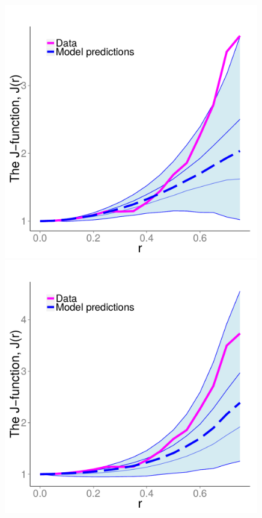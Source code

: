 \documentclass{statsoc}
\begin{document}
\begin{figure}
\begin{minipage}[h]{0.76\linewidth}
\begin{minipage}[h]{0.49\linewidth}
  \includegraphics[width=0.99\textwidth]{figs/Jfunc_postpred_R10/swed_sc.pdf}
  \end{minipage}
  \begin{minipage}[h]{0.49\linewidth}
  \centering
  \includegraphics[width=0.99\textwidth]{figs/Jfunc_postpred_R10/swed_prob_full.pdf}

\end{minipage}
\end{minipage}
\end{figure}
\end{document}
